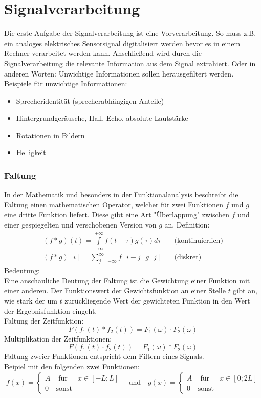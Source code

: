 
\chapter{Signalverarbeitung}

Die erste Aufgabe der Signalverarbeitung ist eine Vorverarbeitung. So muss z.B. ein analoges elektrisches Sensorsignal digitalisiert werden bevor es in einem Rechner verarbeitet werden kann. Anschließend wird durch die Signalverarbeitung die relevante Information aus dem Signal extrahiert. Oder in anderen Worten: Unwichtige Informationen sollen herausgefiltert werden. Beispiele für unwichtige Informationen:
\begin{itemize}
	\item Sprecheridentität (sprecherabhängigen Anteile)
	\item Hintergrundgeräusche, Hall, Echo, absolute Lautstärke
	\item Rotationen in Bildern
	\item Helligkeit
\end{itemize}

\subsection{Faltung}

In der Mathematik und besonders in der Funktionalanalysis beschreibt die Faltung einen mathematischen Operator, welcher für zwei Funktionen $f$ und $g$ eine dritte Funktion liefert. Diese gibt eine Art "{}Überlappung"{} zwischen $f$ und einer gespiegelten und verschobenen Version von $g$ an.
Definition: $$\begin{array}{cl} (f * g)(t) = \int\limits_{- \infty}^{+ \infty} f(t - \tau) g(\tau) d \tau & \quad \textrm{(kontinuierlich)} \\ (f * g)[i] = \sum\limits_{j = - \infty}^{\infty} f[i - j] g[j] & \quad \textrm{(diskret)} \end{array}$$
Bedeutung: \\
Eine anschauliche Deutung der Faltung ist die Gewichtung einer Funktion mit einer anderen. Der Funktionswert der Gewichtsfunktion an einer Stelle $t$ gibt an, wie stark der um $t$ zurückliegende Wert der gewichteten Funktion in den Wert der Ergebnisfunktion eingeht. \\
Faltung der Zeitfunktion: $$F(f_1(t) * f_2(t)) = F_1(\omega) \cdot F_2(\omega)$$
Multiplikation der Zeitfunktionen: $$F(f_1(t) \cdot f_2(t)) = F_1(\omega) * F_2(\omega)$$
Faltung zweier Funktionen entspricht dem Filtern eines Signals. \\[0,1cm]
Beipiel mit den folgenden zwei Funktionen:
$$f(x) = \left\{ \begin{array}{ccc} A & \textrm{ für } & x \in [-L;L] \\ 0 & \textrm{sonst} & \end{array} \right. \quad \textrm{und} \quad g(x) = \left\{ \begin{array}{ccc} A & \textrm{ für } & x \in [0;2L] \\ 0 & \textrm{sonst} & \end{array} \right.$$


